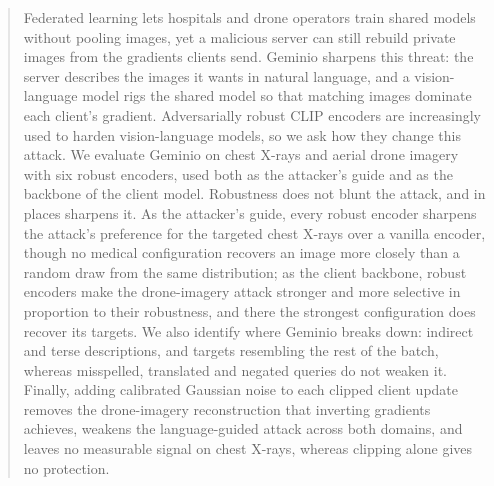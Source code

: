 \begin{abstract}
Federated learning lets hospitals and drone operators train shared models without pooling images, yet a malicious server can still rebuild private images from the gradients clients send.
Geminio sharpens this threat: the server describes the images it wants in natural language, and a vision-language model rigs the shared model so that matching images dominate each client's gradient.
Adversarially robust CLIP encoders are increasingly used to harden vision-language models, so we ask how they change this attack.
We evaluate Geminio on chest X-rays and aerial drone imagery with six robust encoders, used both as the attacker's guide and as the backbone of the client model.
Robustness does not blunt the attack, and in places sharpens it.
As the attacker's guide, every robust encoder sharpens the attack's preference for the targeted chest X-rays over a vanilla encoder, though no medical configuration recovers an image more closely than a random draw from the same distribution; as the client backbone, robust encoders make the drone-imagery attack stronger and more selective in proportion to their robustness, and there the strongest configuration does recover its targets.
We also identify where Geminio breaks down: indirect and terse descriptions, and targets resembling the rest of the batch, whereas misspelled, translated and negated queries do not weaken it.
Finally, adding calibrated Gaussian noise to each clipped client update removes the drone-imagery reconstruction that inverting gradients achieves, weakens the language-guided attack across both domains, and leaves no measurable signal on chest X-rays, whereas clipping alone gives no protection.
\end{abstract}
